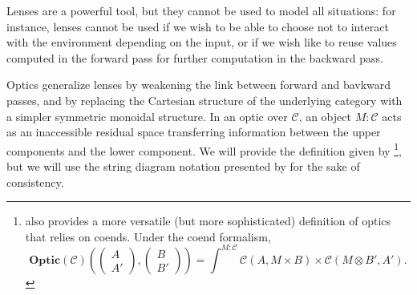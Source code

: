 \documentclass[11pt,a4paper,openright,twoside]{report}
\theoremstyle{plain}
\theoremstyle{definition}
\begin{document}
Lenses are a powerful tool, but they cannot be used to model all situations: for instance, lenses cannot be used if we wish to be able to choose not to interact with the environment depending on the input, or if we wish like to reuse values computed in the forward pass for further computation in the backward pass.


Optics generalize lenses by weakening the link between forward and bavkward passes, and by replacing the Cartesian structure of the underlying category with a simpler symmetric monoidal structure. In an optic over $\mathcal{C}$, an object $M : \mathcal{C}$ acts as an inaccessible residual space transferring information between the upper components and the lower component.
We will provide the definition given by \cite{riley2018categories}\footnote{\cite{riley2018categories}also provides a more versatile (but more sophisticated) definition of optics that relies on coends. Under the coend formalism,
\[\mathbf{Optic}(\mathcal{C})\left(\left(\begin{smallmatrix} A \\ A' \end{smallmatrix}\right),\left(\begin{smallmatrix} B \\ B' \end{smallmatrix}\right)\right) = \int^{M : \mathcal{C}}\mathcal{C}(A,M \times B) \times \mathcal{C}(M \otimes B',A').\]}, but we will use the string diagram notation presented by \cite{gavranovic2024fundamental} for the sake of consistency.
\end{document}
